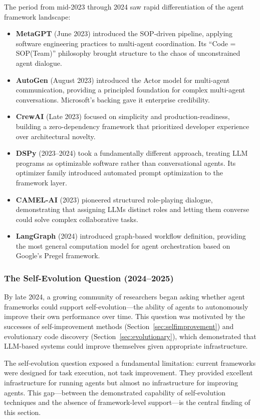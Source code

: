 The period from mid-2023 through 2024 saw rapid differentiation of the agent framework landscape:

\begin{itemize}
    \item \textbf{MetaGPT} (June 2023) introduced the SOP-driven pipeline, applying software engineering practices to multi-agent coordination. Its ``Code = SOP(Team)'' philosophy brought structure to the chaos of unconstrained agent dialogue.
    \item \textbf{AutoGen} (August 2023) introduced the Actor model for multi-agent communication, providing a principled foundation for complex multi-agent conversations. Microsoft's backing gave it enterprise credibility.
    \item \textbf{CrewAI} (Late 2023) focused on simplicity and production-readiness, building a zero-dependency framework that prioritized developer experience over architectural novelty.
    \item \textbf{DSPy} (2023--2024) took a fundamentally different approach, treating LLM programs as optimizable software rather than conversational agents. Its optimizer family introduced automated prompt optimization to the framework layer.
    \item \textbf{CAMEL-AI} (2023) pioneered structured role-playing dialogue, demonstrating that assigning LLMs distinct roles and letting them converse could solve complex collaborative tasks.
    \item \textbf{LangGraph} (2024) introduced graph-based workflow definition, providing the most general computation model for agent orchestration based on Google's Pregel framework.
\end{itemize}

\subsubsection{The Self-Evolution Question (2024--2025)}

By late 2024, a growing community of researchers began asking whether agent frameworks could support self-evolution---the ability of agents to autonomously improve their own performance over time. This question was motivated by the successes of self-improvement methods (Section~\ref{sec:selfimprovement}) and evolutionary code discovery (Section~\ref{sec:evolutionary}), which demonstrated that LLM-based systems could improve themselves given appropriate infrastructure.

The self-evolution question exposed a fundamental limitation: current frameworks were designed for task execution, not task improvement. They provided excellent infrastructure for running agents but almost no infrastructure for improving agents. This gap---between the demonstrated capability of self-evolution techniques and the absence of framework-level support---is the central finding of this section.

